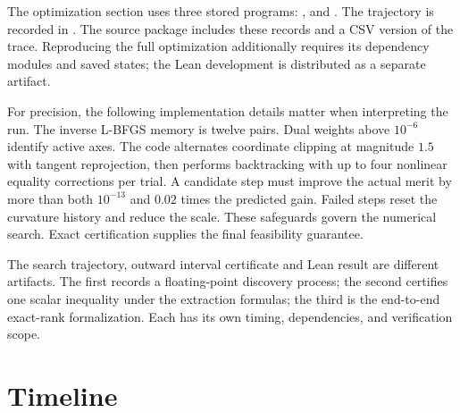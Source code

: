 \documentclass[11pt,a4paper]{article}
\begin{document}
The optimization section uses three stored programs: ,  and . The trajectory is recorded in . The source package includes these records and a CSV version of the trace. Reproducing the full optimization additionally requires its dependency modules and saved states; the Lean development is distributed as a separate artifact.

For precision, the following implementation details matter when interpreting the run. The inverse L-BFGS memory is twelve pairs. Dual weights above $10^{-6}$ identify active axes. The code alternates coordinate clipping at magnitude $1.5$ with tangent reprojection, then performs backtracking with up to four nonlinear equality corrections per trial. A candidate step must improve the actual merit by more than both $10^{-13}$ and $0.02$ times the predicted gain. Failed steps reset the curvature history and reduce the scale. These safeguards govern the numerical search. Exact certification supplies the final feasibility guarantee.

The search trajectory, outward interval certificate and Lean result are different artifacts. The first records a floating-point discovery process; the second certifies one scalar inequality under the extraction formulas; the third is the end-to-end exact-rank formalization. Each has its own timing, dependencies, and verification scope.

\section{Timeline}\label{sec:timeline}
\end{document}
